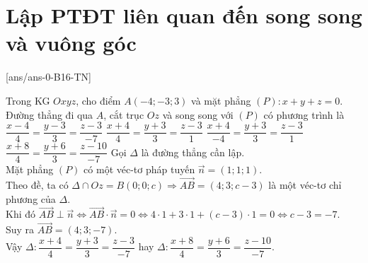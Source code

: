 \section{Lập PTĐT liên quan đến song song và vuông góc}
\TN
{}[ans/ans-0-B16-TN]
\setcounter{ex}{0}
\begin{ex}%
	Trong KG $Oxyz$, cho điểm $A(-4;-3;3)$ và mặt phẳng $(P)\colon x+y+z=0$. Đường thẳng đi qua $A$, cắt trục $Oz$ và song song với $(P)$ có phương trình là
	\choice
	{$\dfrac{x-4}{4}=\dfrac{y-3}{3}=\dfrac{z-3}{-7}$}
	{$\dfrac{x+4}{4}=\dfrac{y+3}{3}=\dfrac{z-3}{1}$}
	{$\dfrac{x+4}{-4}=\dfrac{y+3}{3}=\dfrac{z-3}{1}$}
	{\True $\dfrac{x+8}{4}=\dfrac{y+6}{3}=\dfrac{z-10}{-7}$}
	\loigiai
	{
		Gọi $\Delta$ là đường thẳng cần lập.\\
		Mặt phẳng $(P)$ có một véc-tơ pháp tuyến $\vec{n}=(1;1;1)$.\\
		Theo đề, ta có $\Delta\cap Oz=B(0;0;c) \Rightarrow \overrightarrow{AB}=(4;3;c-3)$ là một véc-tơ chỉ phương của $\Delta$.\\
		Khi đó $\overrightarrow{AB}\perp\vec{n}\Leftrightarrow\overrightarrow{AB}\cdot\vec{n}=0\Leftrightarrow4\cdot1+3\cdot1+(c-3)\cdot1=0\Leftrightarrow c-3=-7$.\\
		Suy ra $\overrightarrow{AB}=(4;3;-7)$.\\
		Vậy $\Delta\colon \dfrac{x+4}{4}=\dfrac{y+3}{3}=\dfrac{z-3}{-7}$ hay $\Delta\colon \dfrac{x+8}{4}=\dfrac{y+6}{3}=\dfrac{z-10}{-7}$.
	}
\end{ex}
